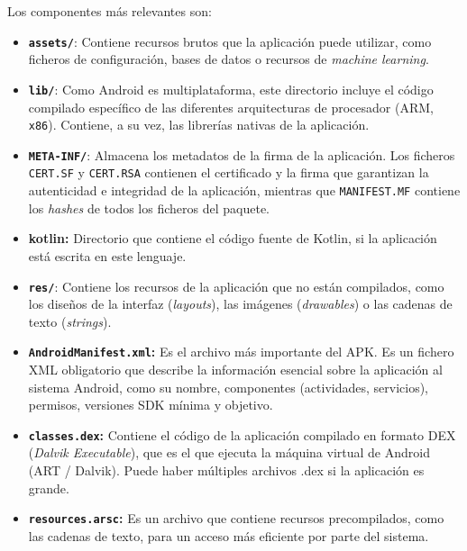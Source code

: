 
Los componentes más relevantes son:
\begin{itemize}
	\item \textbf{\texttt{assets/}}: Contiene recursos brutos que la aplicación puede utilizar, como ficheros de configuración, bases de datos o recursos de \textit{machine learning}.
	
	\item \textbf{\texttt{lib/}}: Como Android es multiplataforma, este directorio incluye el código compilado específico de las diferentes arquitecturas de procesador (ARM, \texttt{x86}). Contiene, a su vez, las librerías nativas de la aplicación.

	\item \textbf{\texttt{META-INF/}}: Almacena los metadatos de la firma de la aplicación. Los ficheros \texttt{CERT.SF} y \texttt{CERT.RSA} contienen el certificado y la firma que garantizan la autenticidad e integridad de la aplicación, mientras que \texttt{MANIFEST.MF} contiene los \textit{hashes} de todos los ficheros del paquete.	

	\item \textbf{kotlin:} Directorio que contiene el código fuente de Kotlin, si la aplicación está escrita en este lenguaje.
	
	\item \textbf{\texttt{res/}}: Contiene los recursos de la aplicación que no están compilados, como los diseños de la interfaz (\textit{layouts}), las imágenes (\textit{drawables}) o las cadenas de texto (\textit{strings}).
	
	\item \textbf{\texttt{AndroidManifest.xml}:} Es el archivo más importante del APK. Es un fichero XML obligatorio que describe la información esencial sobre la aplicación al sistema Android, como su nombre, componentes (actividades, servicios), permisos, versiones SDK mínima y objetivo.
	
	\item \textbf{\texttt{classes.dex}:} Contiene el código de la aplicación compilado en formato DEX (\textit{Dalvik Executable}), que es el que ejecuta la máquina virtual de Android (ART / Dalvik). Puede haber múltiples archivos .dex si la aplicación es grande.
	
	\item \textbf{\texttt{resources.arsc}:} Es un archivo que contiene recursos precompilados, como las cadenas de texto, para un acceso más eficiente por parte del sistema.
\end{itemize}

